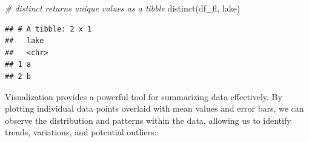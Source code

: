 \documentclass[
]{book}
\newenvironment{Shaded}{\begin{snugshade}}{\end{snugshade}}
\newcommand{\CommentTok}[1]{\textcolor[rgb]{0.56,0.35,0.01}{\textit{#1}}}
\newcommand{\FunctionTok}[1]{\textcolor[rgb]{0.00,0.00,0.00}{#1}}
\newcommand{\NormalTok}[1]{#1}
\begin{document}
\begin{Shaded}
\begin{Highlighting}[]
\CommentTok{\# distinct returns unique values as a tibble}
\FunctionTok{distinct}\NormalTok{(df\_fl, lake)}
\end{Highlighting}
\end{Shaded}

\begin{verbatim}
## # A tibble: 2 x 1
##   lake 
##   <chr>
## 1 a    
## 2 b
\end{verbatim}

Visualization provides a powerful tool for summarizing data effectively. By plotting individual data points overlaid with mean values and error bars, we can observe the distribution and patterns within the data, allowing us to identify trends, variations, and potential outliers:
\end{document}
